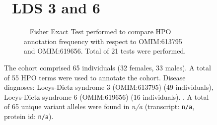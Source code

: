 \begin{figure}[htbp]
\section*{ LDS 3 and 6}
\centering
\begin{subfigure}[b]{0.95\textwidth}
\centering
{}
\captionsetup{justification=raggedright,singlelinecheck=false}
\caption{         Fisher Exact Test performed to compare HPO annotation frequency with respect to OMIM:613795 and OMIM:619656. Total of
        21 tests were performed. }
\end{subfigure}
\vspace{2em}
\caption{ The cohort comprised 65 individuals (32 females, 33 males). A total of 55 HPO terms were used to annotate the cohort. Disease diagnoses: Loeys-Dietz syndrome 3 (OMIM:613795) (49 individuals), Loeys-Dietz syndrome 6 (OMIM:619656) (16 individuals). . A total of 65 unique variant alleles were found in \textit{n/a} (transcript: \texttt{n/a}, protein id: \texttt{n/a}).}
\end{figure}
